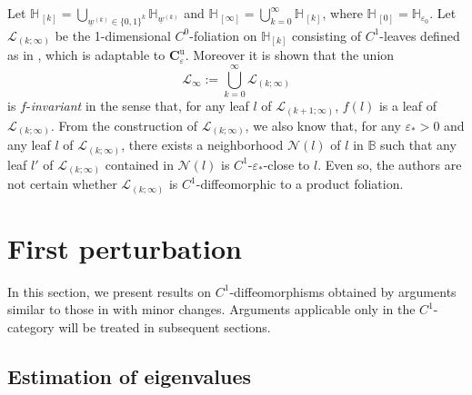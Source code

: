 \documentclass{amsart}
\theoremstyle{plain}
\theoremstyle{definition}
\numberwithin{equation}{section}
\numberwithin{figure}{section}
\def\bb{\mathbb{B}}
\def\hh{\mathbb{H}}
\def\ve{\varepsilon}
\begin{document}
Let  $\mathbb{H}_{\,[k]}=\bigcup_{\underline{w}^{(k)}\in \{0,1\}^k}\mathbb{H}_{\underline{w}^{(k)}}$ and  
$\mathbb{H}_{\,[\infty]}=\bigcup_{k=0}^\infty \mathbb{H}_{\,[k]}$, where $\mathbb{H}_{\,[0]}=\mathbb{H}_{\varepsilon_0}$.
Let $\mathcal{L}_{(k;\infty)}$ be the 1-dimensional $C^0$-foliation on $\hh_{[k]}$ 
consisting of $C^1$-leaves defined as in \cite[Subsection 4.1]{KNS}, which is adaptable to $\boldsymbol{C}_{\varepsilon}^{\mathrm{u}}$.
Moreover it is shown that the union 
\[
\mathcal{L}_\infty:=\bigcup_{k=0}^\infty\mathcal{L}_{(k;\infty)}
\]
is $f$-\emph{invariant} in the sense that, for any 
leaf $l$ of $\mathcal{L}_{(k+1;\infty)}$, $f(l)$ is a leaf of $\mathcal{L}_{(k;\infty)}$.
From the construction of $\mathcal{L}_{(k;\infty)}$, we also know that, for any $\ve_*>0$ and 
any leaf $l$ of $\mathcal{L}_{(k;\infty)}$, there exists a neighborhood $\mathcal{N}(l)$ of 
$l$ in $\bb$ such that any leaf $l'$ of $\mathcal{L}_{(k;\infty)}$ contained in $\mathcal{N}(l)$ is $C^1$-$\ve_*$-close to $l$.
Even so, the authors are not certain whether $\mathcal{L}_{(k;\infty)}$ is $C^1$-diffeomorphic to a product foliation.


\section{First perturbation}

In this section, we present results on $C^1$-diffeomorphisms obtained by 
arguments similar to those in \cite{KNS} with minor changes.
Arguments applicable only in the $C^1$-category will be treated in subsequent sections. 


\subsection{Estimation of eigenvalues}\label{ss_est_eigen}
\end{document}
